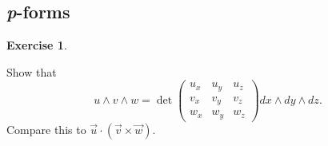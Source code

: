 \documentclass[11pt, a4paper]{article}
\theoremstyle{definition}
\newtheorem{ex}{Exercise}[part]
\begin{document}
\subsection{\emph{p}-forms}

\begin{ex}\label{ex:triplewedgeproduct}

Show that
\[
    u \wedge v \wedge w = \det \begin{pmatrix}
            u_x & u_y & u_z \\
            v_x & v_y & v_z \\
            w_x & w_y & w_z
        \end{pmatrix} dx \wedge dy \wedge dz.
\]
Compare this to $\vec{u} \cdot (\vec{v} \times \vec{w})$.

\end{ex}
\end{document}
